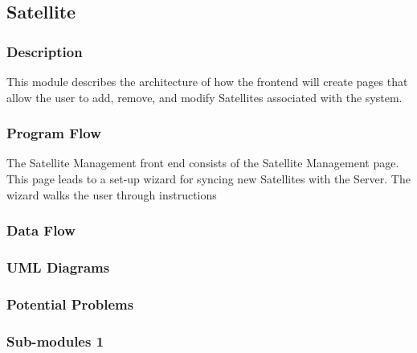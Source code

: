 
\subsection{Satellite}

\subsubsection{Description}

This module describes the architecture of how the frontend will create pages that allow the user to add, remove, and modify Satellites associated with the system.

\subsubsection{Program Flow}

The Satellite Management front end consists of the Satellite Management page. 
This page leads to a set-up wizard for syncing new Satellites with the Server. 
The wizard walks the user through instructions 


\subsubsection{Data Flow}


\subsubsection{UML Diagrams}


\subsubsection{Potential Problems}


\subsubsection{Sub-modules 1}

